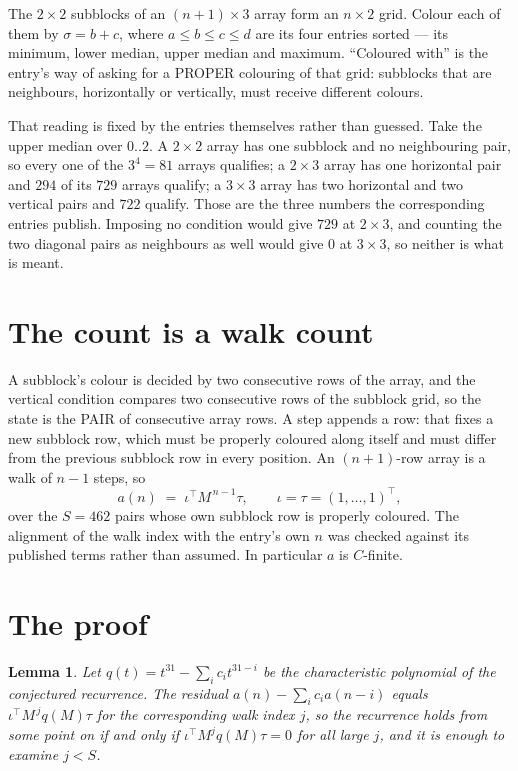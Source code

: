 \documentclass[11pt,a4paper]{article}
\theoremstyle{plain}
\newtheorem{lemma}[theorem]{Lemma}
\theoremstyle{definition}
\begin{document}
The $2\times2$ subblocks of an $(n+1)\times3$ array form an
$n\times2$ grid. Colour each of them by $\sigma=b+c$, where $a\le b\le c\le d$ are its four entries sorted --- its minimum, lower median, upper median and maximum. ``Coloured with'' is the entry's way of
asking for a PROPER colouring of that grid: subblocks that are neighbours, horizontally or
vertically, must receive different colours.

That reading is fixed by the entries themselves rather than guessed. Take the upper median
over $0..2$. A $2\times2$ array has one subblock and no neighbouring pair, so every one of the
$3^4=81$ arrays qualifies; a $2\times3$ array has one horizontal pair and $294$ of its $729$
arrays qualify; a $3\times3$ array has two horizontal and two vertical pairs and $722$
qualify. Those are the three numbers the corresponding entries publish. Imposing no condition
would give $729$ at $2\times3$, and counting the two diagonal pairs as neighbours as well
would give $0$ at $3\times3$, so neither is what is meant.

\section{The count is a walk count}

A subblock's colour is decided by two consecutive rows of the array, and
the vertical condition compares two consecutive rows of the subblock grid, so the state is the
PAIR of consecutive array rows. A step appends a row: that fixes a new subblock row, which
must be properly coloured along itself and must differ from the previous subblock row in every
position. An $(n+1)$-row array is a walk of $n-1$ steps, so
\[
a(n)\;=\;\iota^{\!\top}M^{\,n-1}\tau,\qquad\iota=\tau=(1,\dots,1)^{\!\top},
\]
over the $S=462$ pairs whose own subblock row is properly coloured.
The alignment of the walk index with the entry's own $n$ was checked against its published
terms rather than assumed. In particular $a$ is $C$-finite.

\section{The proof}

\begin{lemma}\label{lem:crit}
Let $q(t)=t^{31}-\sum_i c_it^{31-i}$ be the characteristic polynomial of the
conjectured recurrence. The residual $a(n)-\sum_ic_ia(n-i)$ equals
$\iota^{\!\top}M^{\,j}q(M)\tau$ for the corresponding walk index $j$, so the recurrence
holds from some point on if and only if $\iota^{\!\top}M^{j}q(M)\tau=0$ for all large $j$,
and it is enough to examine $j<S$.
\end{lemma}
\end{document}
